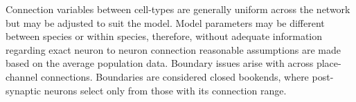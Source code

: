 Connection variables between cell-types are generally uniform across the network but may be adjusted to suit the model.  
Model parameters may be different between species or within species, therefore, without adequate information regarding exact neuron to neuron connection reasonable assumptions are made based on the average population data. 
Boundary issues arise with across place-channel connections.  
Boundaries are considered closed bookends, where post-synaptic neurons select only from those with its connection range.  




